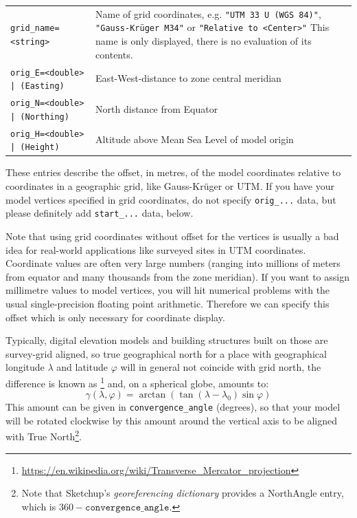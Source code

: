 \begin{longtable}{lp{84mm}} 
\texttt{grid\_name=<string> }& Name of grid coordinates, e.g. \texttt{"UTM 33 U (WGS 84)"},
                               \texttt{"Gauss-Kr\"uger M34"} or \texttt{"Relative to <Center>"} This name is
                              only displayed, there is no evaluation of its contents.\\
\texttt{orig\_E=<double> | (Easting)}  &East-West-distance to zone central meridian\\
\texttt{orig\_N=<double> | (Northing)} &North distance from Equator\\
\texttt{orig\_H=<double> | (Height)}   &Altitude above Mean Sea Level of model origin\\
\end{longtable}

\noindent These entries describe the offset, in metres, of the model coordinates relative
to coordinates in a geographic grid, like Gauss-Kr\"uger or UTM. If you have your model
vertices specified in grid coordinates, do not specify \verb|orig_...| data, but
please definitely add \verb|start_...| data, below.

Note that using grid coordinates without offset for the vertices is
usually a bad idea for real-world applications like surveyed sites in
UTM coordinates. Coordinate values are often very large numbers
(ranging into millions of meters from equator and many thousands from
the zone meridian). If you want to assign millimetre values to model
vertices, you will hit numerical problems with the usual
single-precision floating point arithmetic. Therefore we can specify
this offset which is only necessary for coordinate display.

Typically, digital elevation models and building structures built on
those are survey-grid aligned, so true geographical north for a place
with geographical longitude $\lambda$ and latitude $\varphi$ will in
general not coincide with grid north, the difference is known as
\footnote{%
  \url{https://en.wikipedia.org/wiki/Transverse_Mercator_projection}} 
and, on a spherical globe, amounts to:
\begin{equation}
\gamma(\lambda, \varphi)=\arctan(\tan(\lambda-\lambda_0)\sin\varphi)
\end{equation}
This amount can be given in \verb|convergence_angle| (degrees), so
that your model will be rotated clockwise by this amount around the
vertical axis to be aligned with True North\footnote{Note that
  Sketchup's \emph{georeferencing dictionary} provides a NorthAngle
  entry, which is $360-\mathtt{convergence\_angle}$.}.

